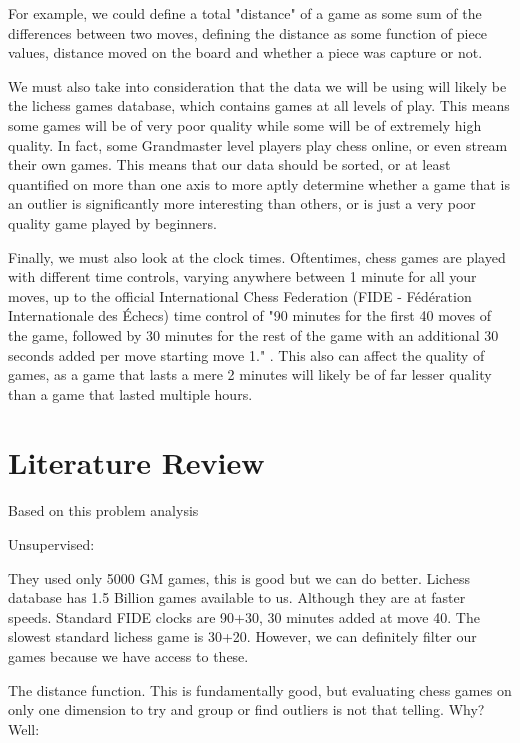 \documentclass[12pt]{article}
\begin{document}
    For example, we could define a total "distance" of a game as some sum of the differences between two moves, defining the distance as some function of piece values, distance moved on the board and whether a piece was capture or not.

    We must also take into consideration that the data we will be using will likely be the lichess games database, which contains games at all levels of play. This means some games will be of very poor quality while some will be of extremely high quality. In fact, some Grandmaster level players play chess online, or even stream their own games. This means that our data should be sorted, or at least quantified on more than one axis to more aptly determine whether a game that is an outlier is significantly more interesting than others, or is just a very poor quality game played by beginners.

    Finally, we must also look at the clock times. Oftentimes, chess games are played with different time controls, varying anywhere between 1 minute for all your moves, up to the official International Chess Federation (FIDE - Fédération Internationale des Échecs) time control of "90 minutes for the first 40 moves of the game, followed by 30 minutes for the rest of the game with an additional 30 seconds added per move starting move 1." \cite{fiderules}. This also can affect the quality of games, as a game that lasts a mere 2 minutes will likely be of far lesser quality than a game that lasted multiple hours. 

    \section{Literature Review}

    Based on this problem analysis 

    Unsupervised:

        They used only 5000 GM games, this is good but we can do better. Lichess database has 1.5 Billion games available to us. Although they are at faster speeds. Standard FIDE clocks are 90+30, 30 minutes added at move 40. The slowest standard lichess game is 30+20. However, we can definitely filter our games because we have access to these. 

        The distance function. This is fundamentally good, but evaluating chess games on only one dimension to try and group or find outliers is not that telling. Why? Well:
\end{document}
